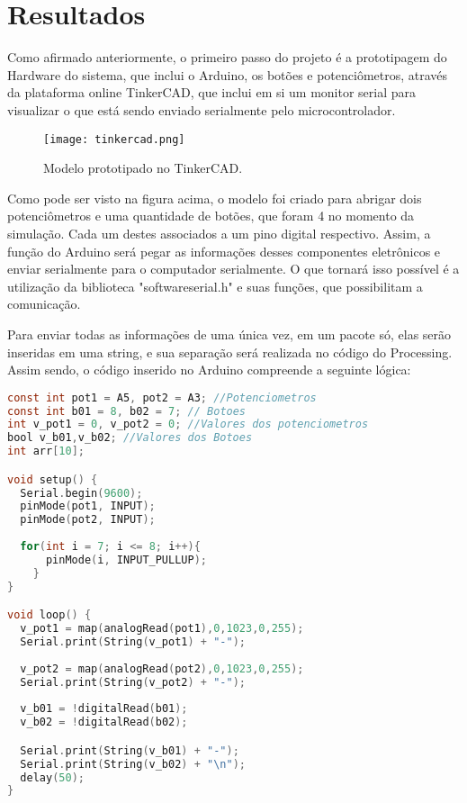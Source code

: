 \section{Resultados}

	Como afirmado anteriormente, o primeiro passo do projeto é a prototipagem do Hardware do sistema, que inclui o Arduino, os botões e potenciômetros, através da plataforma online TinkerCAD, que inclui em si um monitor serial para visualizar o que está sendo enviado serialmente pelo microcontrolador.

\begin{figure}[htbp]
     \centerline{
        \texttt{[image: tinkercad.png]}
        }
     \caption{Modelo prototipado no TinkerCAD.}
     \label{fig}
    \end{figure}

	Como pode ser visto na figura acima, o modelo foi criado para abrigar dois potenciômetros e uma quantidade de botões, que foram 4 no momento da simulação. Cada um destes associados a um pino digital respectivo. Assim, a função do Arduino será pegar as informações desses componentes eletrônicos e enviar serialmente para o computador serialmente. O que tornará isso possível é a utilização da biblioteca "softwareserial.h" e suas funções, que possibilitam a comunicação.
	
	Para enviar todas as informações de uma única vez, em um pacote só, elas serão inseridas em uma string, e sua separação será realizada no código do Processing. Assim sendo, o código inserido no Arduino compreende a seguinte lógica:

\begin{lstlisting}[language=C]
const int pot1 = A5, pot2 = A3; //Potenciometros
const int b01 = 8, b02 = 7; // Botoes
int v_pot1 = 0, v_pot2 = 0; //Valores dos potenciometros
bool v_b01,v_b02; //Valores dos Botoes
int arr[10];

void setup() {
  Serial.begin(9600);
  pinMode(pot1, INPUT);
  pinMode(pot2, INPUT);
  
  for(int i = 7; i <= 8; i++){
      pinMode(i, INPUT_PULLUP);
    }
}

void loop() {
  v_pot1 = map(analogRead(pot1),0,1023,0,255);
  Serial.print(String(v_pot1) + "-");
  
  v_pot2 = map(analogRead(pot2),0,1023,0,255);
  Serial.print(String(v_pot2) + "-");
  
  v_b01 = !digitalRead(b01);
  v_b02 = !digitalRead(b02);

  Serial.print(String(v_b01) + "-");
  Serial.print(String(v_b02) + "\n");
  delay(50);
}
\end{lstlisting}

